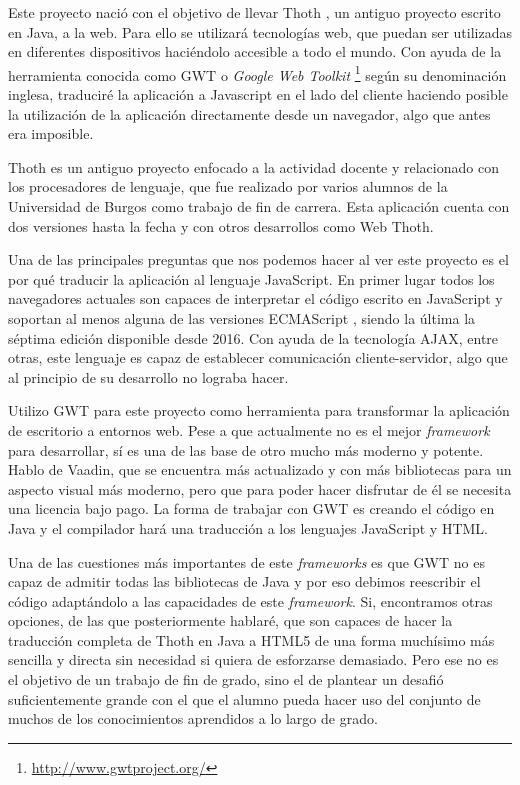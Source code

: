 
Este proyecto nació con el objetivo de llevar Thoth \cite{garcia2007ensenanza}, un antiguo proyecto escrito en Java, a la web. Para ello se utilizará tecnologías web, que puedan ser utilizadas en diferentes dispositivos haciéndolo accesible a todo el mundo. Con ayuda de la herramienta conocida como GWT o \emph{Google Web Toolkit} \footnote{\url{http://www.gwtproject.org/}} según su denominación inglesa, traduciré la aplicación a Javascript en el lado del cliente haciendo posible la utilización de la aplicación directamente desde un navegador, algo que antes era imposible.

Thoth \cite{garcia2007ensenanza}
 es un antiguo proyecto enfocado a la actividad docente y relacionado con los procesadores de lenguaje, que fue realizado por varios alumnos de la Universidad de Burgos como trabajo de fin de carrera. Esta aplicación cuenta con dos versiones  hasta la fecha y con otros desarrollos como Web Thoth\cite{jute2017}.

Una de las principales preguntas que nos podemos hacer al ver este proyecto es el por qué traducir la aplicación al lenguaje JavaScript. 
En primer lugar todos los navegadores actuales son capaces de interpretar el código escrito en JavaScript y soportan al menos alguna de las versiones ECMAScript \cite{ecma:versiones}, siendo la última la séptima edición disponible desde 2016. Con ayuda de la tecnología AJAX, entre otras, este lenguaje es capaz de establecer comunicación cliente-servidor, algo que al principio de su desarrollo no lograba hacer. 

Utilizo GWT para este proyecto como herramienta para transformar la aplicación de escritorio a entornos web. Pese a que actualmente no es el mejor \emph{framework} para desarrollar, sí es una de las base de otro mucho más moderno y potente. Hablo de Vaadin, que se encuentra más actualizado y con más bibliotecas para un aspecto visual más moderno, pero que para poder hacer disfrutar de él se necesita una licencia bajo pago. La forma de trabajar con GWT es creando el código en Java y el compilador hará una traducción a los lenguajes JavaScript y HTML.

Una de las cuestiones más importantes de este \emph{frameworks} es que GWT no es capaz de admitir todas las bibliotecas de Java y por eso debimos reescribir el código adaptándolo a las capacidades de este \emph{framework}. Si, encontramos otras opciones, de las que posteriormente hablaré, que son capaces de hacer la traducción completa de Thoth en Java a HTML5 de una forma muchísimo más sencilla y directa sin necesidad si quiera de esforzarse demasiado. Pero ese no es el objetivo de un trabajo de fin de grado, sino el de plantear un desafió suficientemente grande con el que el alumno pueda hacer uso del conjunto de muchos de los conocimientos aprendidos a lo largo de grado.
